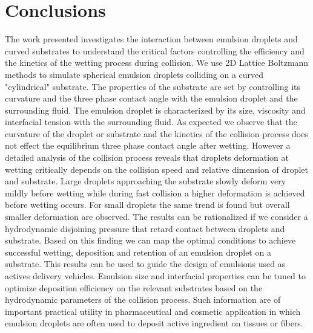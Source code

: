 \documentclass{article}
\begin{document}
\section{Conclusions}
The work presented investigates the interaction between emulsion droplets and curved substrates to understand the critical factors controlling the efficiency and the kinetics of the wetting process during collision. We use 2D Lattice Boltzmann methods to simulate spherical emulsion droplets colliding on a curved "cylindrical" substrate. The properties of the substrate are set by controlling its curvature and the three phase contact angle with the emulsion droplet and the surrounding fluid. The emulsion droplet is characterized by its size, viscosity and interfacial tension with the surrounding fluid. As expected we observe that the curvature of the droplet or substrate and the kinetics of the collision process does not effect the equilibrium three phase contact angle after wetting. However a detailed analysis of the collision process reveals that droplets deformation at wetting critically depends on the collision speed and relative dimension of droplet and substrate. Large droplets approaching the substrate slowly deform very mildly before wetting while during fast collision a higher deformation is achieved before wetting occurs. For small droplets the same trend is found but overall smaller deformation are observed. The results can be rationalized if we consider a hydrodynamic disjoining pressure that retard contact between droplets and substrate. Based on this finding we can map the optimal conditions to achieve successful wetting, deposition and retention of an emulsion droplet on a substrate. This results can be used to guide the design of emulsions used as actives delivery vehicles. Emulsion size and interfacial properties can be tuned to optimize deposition efficiency on the relevant substrates based on the hydrodynamic parameters of the collision process. Such information are of important practical utility in pharmaceutical and cosmetic application in which emulsion droplets are often used to deposit active ingredient on tissues or fibers.  


\end{document}
